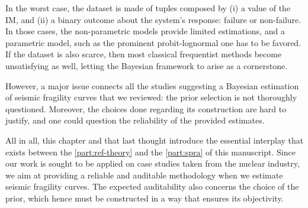 In the worst case, the dataset is %
made of tuples composed by (i) a value of the IM, and (ii) a binary outcome about the system's response: failure or non-failure.
In those cases, the non-parametric models provide limited estimations, and a parametric model, such as the prominent probit-lognormal one has to be favored.
If the dataset is also scarce, then most classical frequentist methods become unsatisfying as well, letting the Bayesian framework to arise as a cornerstone.

However, 
a major issue connects all the studies 
suggesting a Bayesian estimation of seismic fragility curves that we reviewed: the prior selection is not thoroughly questioned. Moreover, the choices done regarding its construction are hard to justify, and one could question the reliability of the provided estimates.



All in all, this chapter and that last thought introduce the essential interplay that exists between the \cref{part:ref-theory} and the \cref{part:spra} of this manuscript.
Since our work is sought to be applied on case studies taken from the nuclear industry, we aim at providing a reliable and auditable methodology when we estimate seismic fragility curves.
The expected  auditability also concerns the choice of the prior, which hence must be constructed in a way that ensures its objectivity.





























